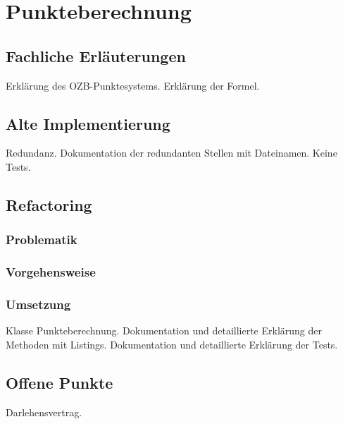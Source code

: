 \documentclass[12pt]{scrreprt}
\begin{document}
  
\chapter{Punkteberechnung}

\section{Fachliche Erläuterungen}
Erklärung des OZB-Punktesystems.
Erklärung der Formel.

\section{Alte Implementierung}
Redundanz. 
Dokumentation der redundanten Stellen mit Dateinamen.
Keine Tests.

\section{Refactoring}

\subsection{Problematik}

\subsection{Vorgehensweise}

\subsection{Umsetzung}
Klasse Punkteberechnung.
Dokumentation und detaillierte Erklärung der Methoden mit Listings.
Dokumentation und detaillierte Erklärung der Tests.

\section{Offene Punkte}
Darlehensvertrag.
\end{document}
